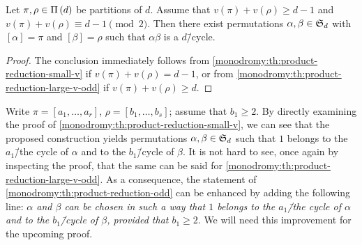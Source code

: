 \begin{corollary}\label{monodromy:th:product-reduction-odd}
Let $\pi,\rho\in\Pi\left(d\right)$ be partitions of $d$. Assume that $v(\pi)+v(\rho)\ge d-1$ and $v(\pi)+v(\rho)\equiv d-1\pmod{2}$. Then there exist permutations $\alpha,\beta\in\symgroup[d]$ with $[\alpha]=\pi$ and $[\beta]=\rho$ such that $\alpha\beta$ is a $d$\=/cycle.
\end{corollary}
\begin{proof}
The conclusion immediately follows from \cref{monodromy:th:product-reduction-small-v} if $v(\pi)+v(\rho)=d-1$, or from \cref{monodromy:th:product-reduction-large-v-odd} if $v(\pi)+v(\rho)\ge d$.
\end{proof}

\begin{remark}\label{monodromy:rm:product-reduction-odd-prescribed-cycles}
Write $\pi=[a_1,\ldots,a_r]$, $\rho=[b_1,\ldots,b_s]$; assume that $b_1\ge 2$. By directly examining the proof of \cref{monodromy:th:product-reduction-small-v}, we can see that the proposed construction yields permutations $\alpha,\beta\in\symgroup[d]$ such that $1$ belongs to the $a_1$\=/the cycle of $\alpha$ and to the $b_1$\=/cycle of $\beta$. It is not hard to see, once again by inspecting the proof, that the same can be said for \cref{monodromy:th:product-reduction-large-v-odd}. As a consequence, the statement of \cref{monodromy:th:product-reduction-odd} can be enhanced by adding the following line: \emph{$\alpha$ and $\beta$ can be chosen in such a way that $1$ belongs to the $a_1$\=/the cycle of $\alpha$ and to the $b_1$\=/cycle of $\beta$, provided that $b_1\ge 2$}. We will need this improvement for the upcoming proof.
\end{remark}

